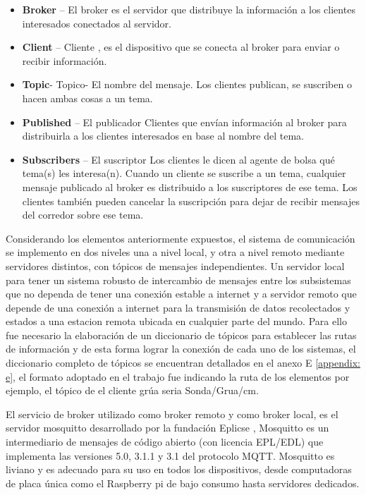 \begin{itemize}
    \item \textbf{Broker} – El broker es el servidor que distribuye la información a los clientes interesados conectados al servidor.
    \item \textbf{Client} – Cliente , es el dispositivo que se conecta al broker para enviar o recibir información.
    \item \textbf{Topic}- Topico- El nombre del mensaje. Los clientes publican, se suscriben o hacen ambas cosas a un tema.
    \item \textbf{Published} – El publicador Clientes que envían información al broker para distribuirla a los clientes interesados en base al nombre del tema.
    \item \textbf{Subscribers} – El suscriptor Los clientes le dicen al agente de bolsa qué tema(s) les interesa(n). Cuando un cliente se suscribe a un tema, cualquier mensaje publicado al broker es distribuido a los suscriptores de ese tema. Los clientes también pueden cancelar la suscripción para dejar de recibir mensajes del corredor sobre ese tema.
\end{itemize}

Considerando los elementos anteriormente expuestos, el sistema de comunicación se implemento en dos niveles una a nivel local, y otra a nivel remoto mediante servidores distintos, con t\'opicos de mensajes independientes. Un servidor local para tener un sistema robusto de intercambio de mensajes entre los subsistemas que no dependa de tener una conexi\'on estable a internet y a servidor remoto que depende de una conexi\'on a internet para la transmisi\'on de datos recolectados y estados a una estacion remota ubicada en cualquier parte del mundo. 
Para ello fue necesario la elaboraci\'on de un diccionario de t\'opicos para establecer las rutas de informaci\'on y de esta forma lograr la conexi\'on de cada uno de los sistemas, el diccionario completo de t\'opicos se encuentran detallados en el anexo E \ref{appendix: e}, el formato adoptado en el trabajo fue indicando la ruta de los elementos por ejemplo, el tópico de el cliente gr\'ua seria Sonda/Grua/cm.

El servicio de broker utilizado como broker remoto y como broker local, es el servidor mosquitto desarrollado por la fundaci\'on Eplicse \cite{mosquitto_eclipse_2018}, Mosquitto es un intermediario de mensajes de código abierto (con licencia EPL/EDL) que implementa las versiones 5.0, 3.1.1 y 3.1 del protocolo MQTT. Mosquitto es liviano y es adecuado para su uso en todos los dispositivos, desde computadoras de placa única como el Raspberry pi de bajo consumo hasta servidores dedicados.


